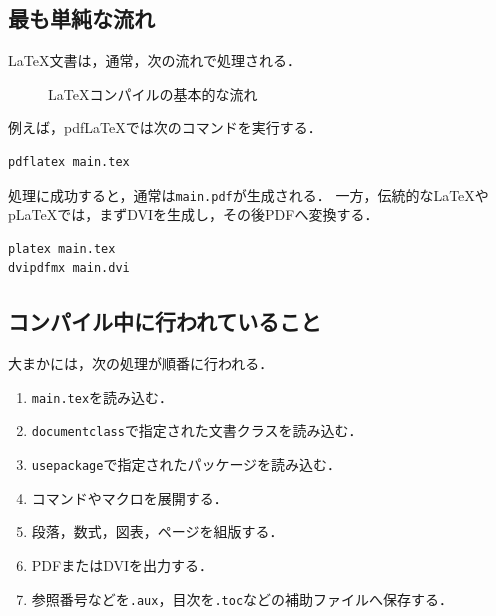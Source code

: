 \documentclass[a4paper,11pt]{jsarticle}
\newcommand{\code}[1]{\texttt{#1}}
\begin{document}
\subsection{最も単純な流れ}

LaTeX文書は，通常，次の流れで処理される．

\begin{figure}[H]
  \centering
  \caption{LaTeXコンパイルの基本的な流れ}
  \label{fig:basic-flow}
\end{figure}

例えば，pdfLaTeXでは次のコマンドを実行する．

\begin{lstlisting}
pdflatex main.tex
\end{lstlisting}

処理に成功すると，通常は\code{main.pdf}が生成される．
一方，伝統的なLaTeXやpLaTeXでは，まずDVIを生成し，その後PDFへ変換する．

\begin{lstlisting}
platex main.tex
dvipdfmx main.dvi
\end{lstlisting}

\clearpage
\subsection{コンパイル中に行われていること}

大まかには，次の処理が順番に行われる．

\begin{enumerate}
  \item \code{main.tex}を読み込む．
  \item \code{documentclass}で指定された文書クラスを読み込む．
  \item \code{usepackage}で指定されたパッケージを読み込む．
  \item コマンドやマクロを展開する．
  \item 段落，数式，図表，ページを組版する．
  \item PDFまたはDVIを出力する．
  \item 参照番号などを\code{.aux}，目次を\code{.toc}などの補助ファイルへ保存する．
\end{enumerate}
\end{document}

